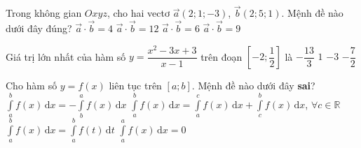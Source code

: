 \begin{ex}%
Trong không gian $Oxyz$, cho hai vectơ $\overrightarrow{a}\left(2;1;-3\right)$, $\overrightarrow{b}\left(2;5;1\right)$. Mệnh đề nào dưới đây đúng?
\choice
{$\overrightarrow{a}\cdot\overrightarrow{b}=4$}
{$\overrightarrow{a}\cdot\overrightarrow{b}=12$}
{\True $\overrightarrow{a}\cdot\overrightarrow{b}=6$}
{$\overrightarrow{a}\cdot\overrightarrow{b}=9$}
\end{ex}

\begin{ex}%
Giá trị lớn nhất của hàm số $y=\dfrac{x^2-3x+3}{x-1}$ trên đoạn $\left[-2;\dfrac{1}{2}\right]$ là
\choice
{$-\dfrac{13}{3}$}
{$1$}
{\True $-3$}
{$-\dfrac{7}{2}$}
\end{ex}

\begin{ex}%
Cho hàm số $y=f(x)$ liên tục trên $\left[a;b\right]$. Mệnh đề nào dưới đây \textbf{sai}?
\choice 
{$\displaystyle\int\limits_{a}^{b} f(x)\mathrm{\,d}x =-\displaystyle\int\limits_{b}^{a} f(x)\mathrm{\,d}x   $}
{\True $\displaystyle\int\limits_{a}^{b} f(x)\mathrm{\,d}x =\displaystyle\int\limits_{a}^{c} f(x)\mathrm{\,d}x +\displaystyle\int\limits_{c}^{b} f(x)\mathrm{\,d}x$, $\forall c\in\mathbb{R	}$}
{$\displaystyle\int\limits_{a}^{b} f(x)\mathrm{\,d}x =\displaystyle\int\limits_{a}^{b} f(t)\mathrm{\,d}t$}
{$\displaystyle\int\limits_{a}^{a} f(x)\mathrm{\,d}x =0 $}
\end{ex}

